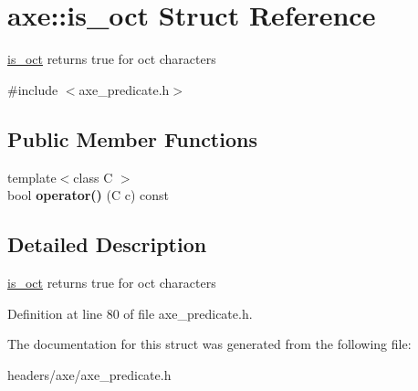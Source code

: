 \hypertarget{structaxe_1_1is__oct}{\section{axe\+:\+:is\+\_\+oct Struct Reference}
\label{structaxe_1_1is__oct}
}


\hyperlink{structaxe_1_1is__oct}{is\+\_\+oct} returns true for oct characters  




{\ttfamily \#include $<$axe\+\_\+predicate.\+h$>$}

\subsection*{Public Member Functions}
\begin{DoxyCompactItemize}
\item 
\hypertarget{structaxe_1_1is__oct_a5d4964c4e92d49bdd3c31f2168cf44f5}{{\footnotesize template$<$class C $>$ }\\bool {\bfseries operator()} (C c) const }\label{structaxe_1_1is__oct_a5d4964c4e92d49bdd3c31f2168cf44f5}

\end{DoxyCompactItemize}


\subsection{Detailed Description}
\hyperlink{structaxe_1_1is__oct}{is\+\_\+oct} returns true for oct characters 

Definition at line 80 of file axe\+\_\+predicate.\+h.



The documentation for this struct was generated from the following file\+:\begin{DoxyCompactItemize}
\item 
headers/axe/axe\+\_\+predicate.\+h\end{DoxyCompactItemize}
